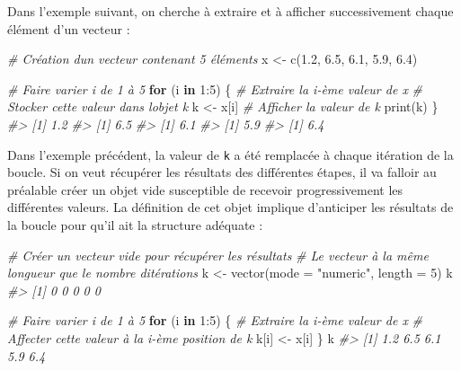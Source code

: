 \documentclass[
  french,
]{scrbook}
\newenvironment{Shaded}{\begin{snugshade}}{\end{snugshade}}
\newcommand{\AttributeTok}[1]{\textcolor[rgb]{0.77,0.63,0.00}{#1}}
\newcommand{\CommentTok}[1]{\textcolor[rgb]{0.56,0.35,0.01}{\textit{#1}}}
\newcommand{\ControlFlowTok}[1]{\textcolor[rgb]{0.13,0.29,0.53}{\textbf{#1}}}
\newcommand{\DecValTok}[1]{\textcolor[rgb]{0.00,0.00,0.81}{#1}}
\newcommand{\FloatTok}[1]{\textcolor[rgb]{0.00,0.00,0.81}{#1}}
\newcommand{\FunctionTok}[1]{\textcolor[rgb]{0.00,0.00,0.00}{#1}}
\newcommand{\NormalTok}[1]{#1}
\newcommand{\OtherTok}[1]{\textcolor[rgb]{0.56,0.35,0.01}{#1}}
\newcommand{\SpecialCharTok}[1]{\textcolor[rgb]{0.00,0.00,0.00}{#1}}
\newcommand{\StringTok}[1]{\textcolor[rgb]{0.31,0.60,0.02}{#1}}
\begin{document}
Dans l'exemple suivant, on cherche à extraire et à afficher successivement chaque élément d'un vecteur :

\begin{Shaded}
\begin{Highlighting}[]
\CommentTok{\# Création d\textquotesingle{}un vecteur contenant 5 éléments}
\NormalTok{x }\OtherTok{\textless{}{-}} \FunctionTok{c}\NormalTok{(}\FloatTok{1.2}\NormalTok{, }\FloatTok{6.5}\NormalTok{, }\FloatTok{6.1}\NormalTok{, }\FloatTok{5.9}\NormalTok{, }\FloatTok{6.4}\NormalTok{)}

\CommentTok{\# Faire varier i de 1 à 5}
\ControlFlowTok{for}\NormalTok{ (i }\ControlFlowTok{in} \DecValTok{1}\SpecialCharTok{:}\DecValTok{5}\NormalTok{) \{}
  \CommentTok{\# Extraire la i{-}ème valeur de x}
  \CommentTok{\# Stocker cette valeur dans l\textquotesingle{}objet k}
\NormalTok{  k }\OtherTok{\textless{}{-}}\NormalTok{ x[i]}
  \CommentTok{\# Afficher la valeur de k}
  \FunctionTok{print}\NormalTok{(k)}
\NormalTok{\}}
\CommentTok{\#\textgreater{} [1] 1.2}
\CommentTok{\#\textgreater{} [1] 6.5}
\CommentTok{\#\textgreater{} [1] 6.1}
\CommentTok{\#\textgreater{} [1] 5.9}
\CommentTok{\#\textgreater{} [1] 6.4}
\end{Highlighting}
\end{Shaded}

Dans l'exemple précédent, la valeur de \texttt{k} a été remplacée à chaque itération de la boucle. Si on veut récupérer les résultats des différentes étapes, il va falloir au préalable créer un objet vide susceptible de recevoir progressivement les différentes valeurs. La définition de cet objet implique d'anticiper les résultats de la boucle pour qu'il ait la structure adéquate :

\begin{Shaded}
\begin{Highlighting}[]
\CommentTok{\# Créer un vecteur vide pour récupérer les résultats}
\CommentTok{\# Le vecteur à la même longueur que le nombre d\textquotesingle{}itérations}
\NormalTok{k }\OtherTok{\textless{}{-}} \FunctionTok{vector}\NormalTok{(}\AttributeTok{mode =} \StringTok{"numeric"}\NormalTok{, }\AttributeTok{length =} \DecValTok{5}\NormalTok{)}
\NormalTok{k}
\CommentTok{\#\textgreater{} [1] 0 0 0 0 0}

\CommentTok{\# Faire varier i de 1 à 5}
\ControlFlowTok{for}\NormalTok{ (i }\ControlFlowTok{in} \DecValTok{1}\SpecialCharTok{:}\DecValTok{5}\NormalTok{) \{}
  \CommentTok{\# Extraire la i{-}ème valeur de x}
  \CommentTok{\# Affecter cette valeur à la i{-}ème position de k}
\NormalTok{  k[i] }\OtherTok{\textless{}{-}}\NormalTok{ x[i]}
\NormalTok{\}}
\NormalTok{k}
\CommentTok{\#\textgreater{} [1] 1.2 6.5 6.1 5.9 6.4}
\end{Highlighting}
\end{Shaded}
\end{document}
